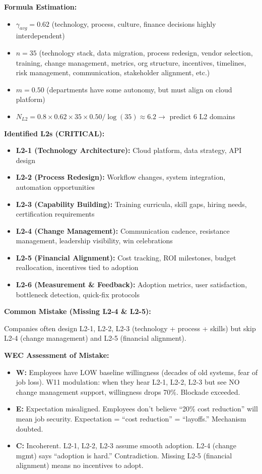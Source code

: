 \documentclass[11pt, a4paper]{article}
\begin{document}
\textbf{Formula Estimation:}
\begin{itemize}[nosep]
    \item $\gamma_{avg} = 0.62$ (technology, process, culture, finance decisions highly interdependent)
    \item $n = 35$ (technology stack, data migration, process redesign, vendor selection, training, change management, metrics, org structure, incentives, timelines, risk management, communication, stakeholder alignment, etc.)
    \item $m = 0.50$ (departments have some autonomy, but must align on cloud platform)
    \item $N_{L2} = 0.8 \times 0.62 \times 35 \times 0.50 / \log(35) \approx 6.2 \rightarrow$ predict 6 L2 domains
\end{itemize}

\textbf{Identified L2s (CRITICAL):}
\begin{itemize}[nosep]
    \item \textbf{L2-1 (Technology Architecture):} Cloud platform, data strategy, API design
    \item \textbf{L2-2 (Process Redesign):} Workflow changes, system integration, automation opportunities
    \item \textbf{L2-3 (Capability Building):} Training curricula, skill gaps, hiring needs, certification requirements
    \item \textbf{L2-4 (Change Management):} Communication cadence, resistance management, leadership visibility, win celebrations
    \item \textbf{L2-5 (Financial Alignment):} Cost tracking, ROI milestones, budget reallocation, incentives tied to adoption
    \item \textbf{L2-6 (Measurement \& Feedback):} Adoption metrics, user satisfaction, bottleneck detection, quick-fix protocols
\end{itemize}

\textbf{Common Mistake (Missing L2-4 \& L2-5):}

Companies often design L2-1, L2-2, L2-3 (technology + process + skills) but skip L2-4 (change management) and L2-5 (financial alignment).

\textbf{WEC Assessment of Mistake:}
\begin{itemize}[nosep]
    \item \textbf{W:} Employees have LOW baseline willingness (decades of old systems, fear of job loss). W11 modulation: when they hear L2-1, L2-2, L2-3 but see NO change management support, willingness drops 70\%. Blockade exceeded.
    \item \textbf{E:} Expectation misaligned. Employees don't believe ``20\% cost reduction'' will mean job security. Expectation = ``cost reduction'' = ``layoffs.'' Mechanism doubted.
    \item \textbf{C:} Incoherent. L2-1, L2-2, L2-3 assume smooth adoption. L2-4 (change mgmt) says ``adoption is hard.'' Contradiction. Missing L2-5 (financial alignment) means no incentives to adopt.
\end{itemize}
\end{document}
